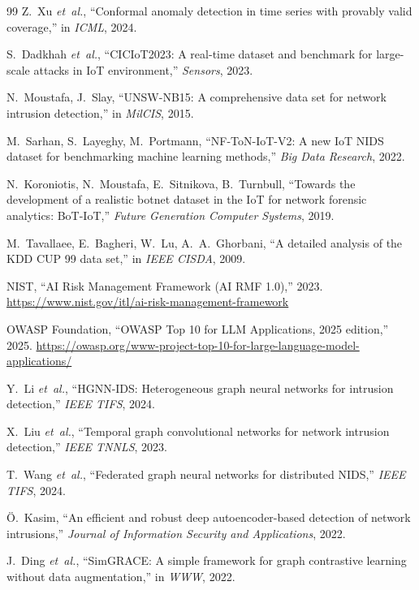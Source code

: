 \documentclass[journal,twoside]{IEEEtran}
\begin{document}
\begin{thebibliography}{99}
Z.~Xu \emph{et~al.},
``Conformal anomaly detection in time series with provably valid
coverage,'' in \emph{ICML}, 2024.

S.~Dadkhah \emph{et~al.},
``CICIoT2023: A real-time dataset and benchmark for large-scale attacks
in IoT environment,'' \emph{Sensors}, 2023.

N.~Moustafa, J.~Slay,
``UNSW-NB15: A comprehensive data set for network intrusion detection,''
in \emph{MilCIS}, 2015.

M.~Sarhan, S.~Layeghy, M.~Portmann,
``NF-ToN-IoT-V2: A new IoT NIDS dataset for benchmarking machine learning
methods,'' \emph{Big Data Research}, 2022.

N.~Koroniotis, N.~Moustafa, E.~Sitnikova, B.~Turnbull,
``Towards the development of a realistic botnet dataset in the IoT for
network forensic analytics: BoT-IoT,''
\emph{Future Generation Computer Systems}, 2019.

M.~Tavallaee, E.~Bagheri, W.~Lu, A.~A.~Ghorbani,
``A detailed analysis of the KDD CUP 99 data set,'' in \emph{IEEE CISDA},
2009.

NIST,
``AI Risk Management Framework (AI RMF 1.0),'' 2023.
\url{https://www.nist.gov/itl/ai-risk-management-framework}

OWASP Foundation,
``OWASP Top 10 for LLM Applications, 2025 edition,'' 2025.
\url{https://owasp.org/www-project-top-10-for-large-language-model-applications/}

Y.~Li \emph{et~al.}, ``HGNN-IDS: Heterogeneous graph neural networks
for intrusion detection,'' \emph{IEEE TIFS}, 2024.

X.~Liu \emph{et~al.}, ``Temporal graph convolutional networks for
network intrusion detection,'' \emph{IEEE TNNLS}, 2023.

T.~Wang \emph{et~al.}, ``Federated graph neural networks for distributed
NIDS,'' \emph{IEEE TIFS}, 2024.

Ö.~Kasim,
``An efficient and robust deep autoencoder-based detection of network
intrusions,'' \emph{Journal of Information Security and Applications},
2022.

J.~Ding \emph{et~al.}, ``SimGRACE: A simple framework for graph
contrastive learning without data augmentation,'' in \emph{WWW}, 2022.


\end{thebibliography}
\end{document}
